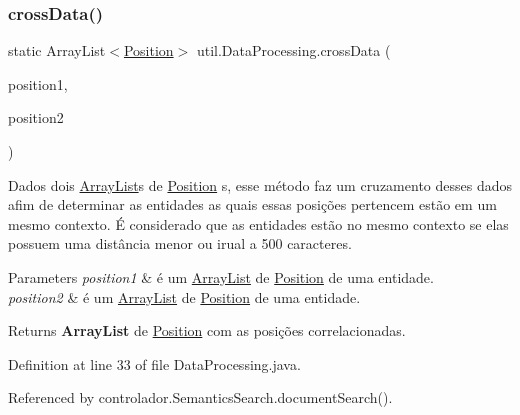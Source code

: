 \subsubsection{\texorpdfstring{cross\+Data()}{crossData()}}
{\footnotesize\ttfamily static Array\+List$<$\hyperlink{classentidade_1_1Position}{Position}$>$ util.\+Data\+Processing.\+cross\+Data (\begin{DoxyParamCaption}\item[{Array\+List$<$ \hyperlink{classentidade_1_1Position}{Position} $>$}]{position1,  }\item[{Array\+List$<$ \hyperlink{classentidade_1_1Position}{Position} $>$}]{position2 }\end{DoxyParamCaption})\hspace{0.3cm}{\ttfamily [static]}}

Dados dois \hyperlink{}{Array\+List}s de \hyperlink{}{Position} s, esse método faz um cruzamento desses dados afim de determinar as entidades as quais essas posições pertencem estão em um mesmo contexto. É considerado que as entidades estão no mesmo contexto se elas possuem uma distância menor ou irual a 500 caracteres.


\begin{DoxyParams}{Parameters}
{\em position1} & é um \hyperlink{}{Array\+List} de \hyperlink{}{Position} de uma entidade. \\
\hline
{\em position2} & é um \hyperlink{}{Array\+List} de \hyperlink{}{Position} de uma entidade. \\
\hline
\end{DoxyParams}
\begin{DoxyReturn}{Returns}
{\bfseries Array\+List} de \hyperlink{}{Position} com as posições correlacionadas. 
\end{DoxyReturn}


Definition at line 33 of file Data\+Processing.\+java.



Referenced by controlador.\+Semantics\+Search.\+document\+Search().

\hypertarget{classutil_1_1DataProcessing_a9929ea41acdba832995351f10610135a}{}\label{classutil_1_1DataProcessing_a9929ea41acdba832995351f10610135a} 
